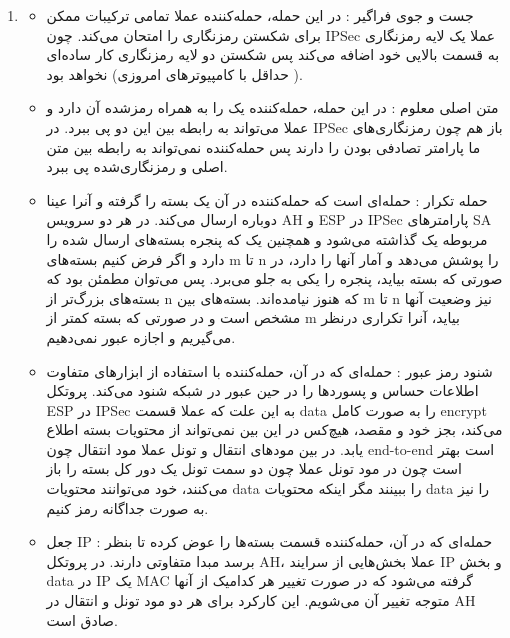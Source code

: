 \begin{enumerate}[label=\alph*)]
\item 
    \begin{itemize}
      \item جست و جوی فراگیر :
      در این حمله، حمله‌کننده عملا تمامی ترکیبات ممکن برای شکستن 
      رمزنگاری را امتحان می‌کند. چون IPSec عملا یک لایه رمزنگاری 
      به قسمت بالایی خود اضافه می‌کند پس شکستن دو لایه رمزنگاری کار 
      ساده‌ای ( حداقل با کامپیوترهای امروزی) نخواهد بود.
      \item متن اصلی معلوم : 
      در این حمله، حمله‌کننده یک 
      را به همراه رمز‌شده آن دارد و عملا می‌تواند به رابطه بین این دو پی ببرد. در 
      IPSec باز هم چون رمزنگاری‌های ما پارامتر تصادفی بودن را دارند 
      پس حمله‌کننده نمی‌تواند به رابطه بین متن اصلی و رمزنگاری‌شده پی ببرد.
      \item حمله تکرار : 
      حمله‌ای است که حمله‌کننده در آن یک بسته را گرفته
      و آنرا عینا دوباره ارسال می‌کند. در هر دو سرویس AH 
      و 
      ESP 
      در IPSec 
      پارامترهای SA 
      مربوطه یک 
      گذاشته می‌شود و همچنین یک 
      که پنجره بسته‌های ارسال شده را دارد و اگر فرض کنیم بسته‌های 
      m تا n را پوشش می‌دهد و آمار آنها را دارد، 
      در صورتی که بسته
      بیاید، پنجره را یکی به جلو می‌برد. پس می‌توان مطمئن بود که 
      بسته‌های 
      بزرگ‌تر از n که هنوز نیامده‌اند.
      بسته‌های بین m تا n نیز وضعیت آنها مشخص است و 
      در صورتی که بسته کمتر از m بیاید، آنرا تکراری درنظر می‌گیریم و 
      اجازه عبور نمی‌دهیم.
      \item شنود رمز عبور : 
      حمله‌ای که در آن، حمله‌کننده با استفاده از ابزارهای متفاوت 
      اطلاعات حساس و پسوردها را در حین عبور در شبکه شنود می‌کند. 
      پروتکل ESP در 
      IPSec 
      به این علت که عملا قسمت data را به صورت کامل 
      encrypt می‌کند، 
      بجز خود و مقصد،‌ هیچ‌‌کس در این بین نمی‌تواند از محتویات 
      بسته اطلاع یابد. در بین مودهای انتقال و 
      تونل عملا مود انتقال چون end-to-end است بهتر است چون 
      در مود تونل عملا چون دو سمت تونل یک دور کل بسته را باز می‌کنند، 
      خود می‌توانند محتویات data را ببینند مگر اینکه
      محتویات data را نیز به صورت جداگانه رمز کنیم.
      \item جعل IP : 
      حمله‌ای که در آن، حمله‌کننده قسمت 
      بسته‌ها را عوض کرده
      تا بنظر برسد مبدا متفاوتی دارند.
      در پروتکل 
      AH، 
      عملا بخش‌هایی از سرایند 
      IP
       و 
      بخش data در IP یک MAC گرفته می‌شود که در صورت
      تغییر هر کدامیک از آنها متوجه تغییر آن می‌شویم.
      این کارکرد برای هر دو مود تونل و انتقال در AH 
      صادق است.


\end{itemize}
\end{enumerate}
